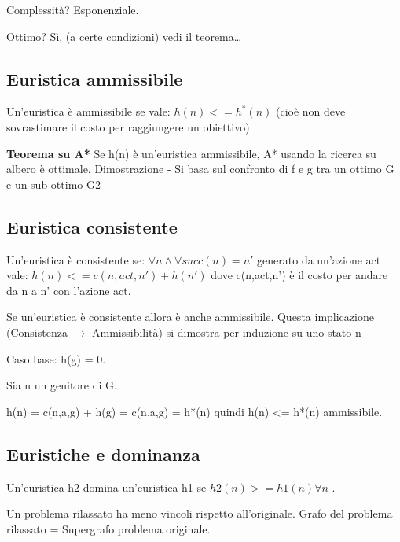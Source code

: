 Complessità? Esponenziale.

Ottimo? Sì, (a certe condizioni) vedi il teorema\dots

\subsection{Euristica ammissibile}

Un'euristica è ammissibile se vale: $h(n) <= h^*(n)$
(cioè non deve sovrastimare il costo per raggiungere un obiettivo)

\textbf{Teorema su A*}
Se h(n) è un'euristica ammissibile,  A* usando la ricerca su albero è ottimale.
Dimostrazione - Si basa sul confronto di f e g tra un ottimo G e un sub-ottimo G2

\subsection{Euristica consistente}

Un'euristica è consistente se:
$\forall n \land \forall succ(n) = n'$ generato da un'azione act vale: $h(n) <= c(n,act,n') + h(n')$
dove c(n,act,n') è il costo per andare da n a n' con l'azione act.

Se un'euristica è consistente allora è anche ammissibile.
Questa implicazione (Consistenza $\rightarrow$ Ammissibilità) si dimostra per induzione su uno stato n

Caso base:
h(g) = 0.

Sia n un genitore di G.

h(n) = c(n,a,g) + h(g) = c(n,a,g) = h*(n) quindi h(n) <= h*(n) ammissibile.

\subsection{Euristiche e dominanza}

Un'euristica h2 domina un'euristica h1 se $h2(n) >= h1(n) \forall n$ .

Un problema rilassato ha meno vincoli rispetto all'originale.
Grafo del problema rilassato = Supergrafo problema originale.
